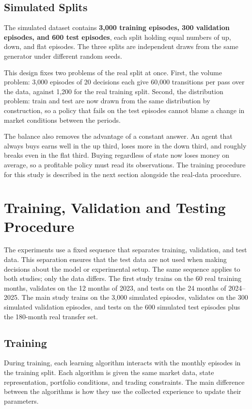 \subsection{Simulated Splits}

The simulated dataset contains \textbf{3,000 training episodes, 300
validation episodes, and 600 test episodes}, each split holding equal
numbers of up, down, and flat episodes. The three splits are independent
draws from the same generator under different random seeds.

This design fixes two problems of the real split at once. First, the
volume problem: 3,000 episodes of 20 decisions each give 60,000
transitions per pass over the data, against 1,200 for the real training
split. Second, the distribution problem: train and test are now drawn
from the same distribution by construction, so a policy that fails on
the test episodes cannot blame a change in market conditions between the
periods.

The balance also removes the advantage of a constant answer. An agent that
always buys earns well in the up third, loses more in the down third,
and roughly breaks even in the flat third. Buying regardless of state
now loses money on average, so a profitable policy must read its
observations. The training procedure for this study is described in the
next section alongside the real-data procedure.

\section{Training, Validation and Testing Procedure}

The experiments use a fixed sequence that separates training,
validation, and test data. This separation ensures that the test data
are not used when making decisions about the model or experimental
setup. The same sequence applies to both studies; only the data
differs. The first study trains on the 60 real training months, validates on
the 12 months of 2023, and tests on the 24 months of 2024--2025. The
main study trains on the 3,000 simulated episodes, validates on the 300
simulated validation episodes, and tests on the 600 simulated test
episodes plus the 180-month real transfer set.

\subsection{Training}

During training, each learning algorithm interacts with the monthly
episodes in the training split. Each algorithm is given the same market
data, state representation, portfolio conditions, and trading
constraints. The main difference between the algorithms is how they use
the collected experience to update their parameters.

